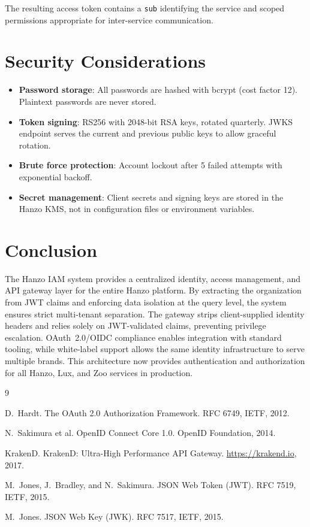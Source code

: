 \documentclass[11pt,a4paper]{article}
\begin{document}
The resulting access token contains a \texttt{sub} identifying the service and scoped permissions appropriate for inter-service communication.

\section{Security Considerations}

\begin{itemize}
    \item \textbf{Password storage}: All passwords are hashed with bcrypt (cost factor 12). Plaintext passwords are never stored.
    \item \textbf{Token signing}: RS256 with 2048-bit RSA keys, rotated quarterly. JWKS endpoint serves the current and previous public keys to allow graceful rotation.
    \item \textbf{Brute force protection}: Account lockout after 5 failed attempts with exponential backoff.
    \item \textbf{Secret management}: Client secrets and signing keys are stored in the Hanzo KMS, not in configuration files or environment variables.
\end{itemize}

\section{Conclusion}

The Hanzo IAM system provides a centralized identity, access management, and API gateway layer for the entire Hanzo platform. By extracting the organization from JWT claims and enforcing data isolation at the query level, the system ensures strict multi-tenant separation. The gateway strips client-supplied identity headers and relies solely on JWT-validated claims, preventing privilege escalation. OAuth~2.0/OIDC compliance enables integration with standard tooling, while white-label support allows the same identity infrastructure to serve multiple brands. This architecture now provides authentication and authorization for all Hanzo, Lux, and Zoo services in production.


\begin{thebibliography}{9}

D.~Hardt. The OAuth 2.0 Authorization Framework. RFC 6749, IETF, 2012.

N.~Sakimura et al. OpenID Connect Core 1.0. OpenID Foundation, 2014.

KrakenD. KrakenD: Ultra-High Performance API Gateway. \url{https://krakend.io}, 2017.

M.~Jones, J.~Bradley, and N.~Sakimura. JSON Web Token (JWT). RFC 7519, IETF, 2015.

M.~Jones. JSON Web Key (JWK). RFC 7517, IETF, 2015.

\end{thebibliography}
\end{document}
